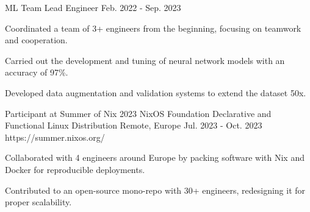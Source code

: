 \begin{cventries}
	\cventry%
	{ML Team Lead Engineer} %
	{} %
	{}
	{} %
	{Feb. 2022 - Sep. 2023} %
	{} %
	{
		\begin{cvitems} %
			\item {Coordinated a team of 3+ engineers from the beginning, focusing on teamwork and cooperation.}
			\item {Carried out the development and tuning of neural network models with an accuracy of 97\%.}
			\item {Developed data augmentation and validation systems to extend the dataset 50x.}
		\end{cvitems}
	}

	\cventry
	{Participant at Summer of Nix 2023} %
	{NixOS Foundation} %
	{Declarative and Functional Linux Distribution}
	{Remote, Europe} %
	{Jul. 2023 - Oct. 2023} %
	{https://summer.nixos.org/} %
	{
		\begin{cvitems} %
			\item {Collaborated with 4 engineers around Europe by packing software with Nix and Docker for reproducible deployments.}
			\item {Contributed to an open-source mono-repo with 30+ engineers, redesigning it for proper scalability.}
		\end{cvitems}
	}

\end{cventries}
